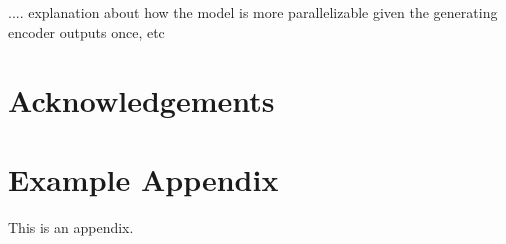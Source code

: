\documentclass[11pt]{article}
\begin{document}
.... explanation about how the model is more parallelizable given the generating encoder outputs once, etc


\section*{Acknowledgements}




\appendix


\section{Example Appendix}
\label{sec:appendix}

This is an appendix.
\end{document}

